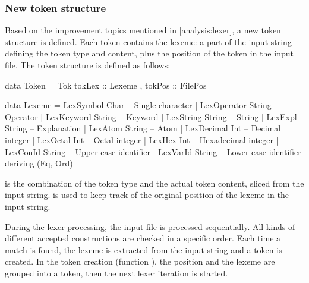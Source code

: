 \subsubsection{New token structure}
Based on the improvement topics mentioned in \autoref{analysis:lexer}, a new token structure is defined.
Each token contains the lexeme: a part of the input string defining the token type and content, plus the position of the token in the input file.
The token structure is defined as follows:

\begin{haskell}
data Token = Tok { tokLex :: Lexeme
                 , tokPos :: FilePos
                 }
                        
data Lexeme  = LexSymbol      Char           -- Single character
             | LexOperator    String         -- Operator
             | LexKeyword     String         -- Keyword
             | LexString      String         -- String
             | LexExpl        String         -- Explanation
             | LexAtom        String         -- Atom
             | LexDecimal     Int            -- Decimal integer
             | LexOctal       Int            -- Octal integer
             | LexHex         Int            -- Hexadecimal integer
             | LexConId       String         -- Upper case identifier
             | LexVarId       String         -- Lower case identifier
  deriving (Eq, Ord)
\end{haskell}
%
 is the combination of the token type and the actual token content, sliced from the input string.
 is used to keep track of the original position of the lexeme in the input string.

During the lexer processing, the input file is processed sequentially.
All kinds of different accepted constructions are checked in a specific order.
Each time a match is found, the lexeme is extracted from the input string and a token is created.
In the token creation (function ), the position and the lexeme are grouped into a token, then the next lexer iteration is started.
